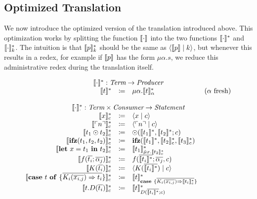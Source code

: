 \subsection{Optimized Translation}
\label{subsec:translation:optimized}
We now introduce the optimized version of the translation introduced above.
This optimization works by splitting the function $\llbracket \cdot \rrbracket$ into the two functions $\llbracket \cdot \rrbracket_{}^{\ast}$ and $\llbracket \cdot \rrbracket_{k}^{\ast}$.
The intuition is that $\llbracket p \rrbracket_{k}^{\ast}$ should be the same as $\langle \llbracket p \rrbracket \mid k \rangle$, but whenever this results in a redex, for example if $\llbracket p \rrbracket$ has the form $\mu \alpha.s$, we reduce this administrative redex during the translation itself.

\[
  \begin{array}{rcll}
    \multicolumn{4}{c}{\translatestar{\cdot}{} : \emph{Term} \rightarrow  \emph{Producer}}\\
    \translatestar{t}{} & \coloneqq & \mu\alpha.\translatestar{t}{\alpha} & \fresh{\alpha}\\
    \\
    \multicolumn{4}{c}{\translatestar{\cdot}{\cdot} : \emph{Term} \times \emph{Consumer} \rightarrow \emph{Statement}}\\
    \translatestar{x}{c} & \coloneq & \cut{x}{c} & \\
    \translatestar{\lit{n}}{c} & \coloneq & \cut{\lit{n}}{c} & \\
    \translatestar{t_1 \odot t_2}{c} & \coloneq & \odot(\translatestar{t_1}{}, \translatestar{t_2}{}; c) & \\
    \translatestar{\ifz{t_1}{t_2}{t_2}}{c} & \coloneq & \ifz{\translatestar{t_1}{}}{\translatestar{t_2}{c}}{\translatestar{t_3}{c}} & \\
    \translatestar{\letin{x}{t_1}{t_2}}{c} & \coloneq & \translatestar{t_1}{\tilde{\mu}x.\translatestar{t_2}{c}} & \\
    \translatestar{f(\overline{t_i}; \overline{\alpha_j})}{c} & \coloneq & f(\overline{\translatestar{t_i}{}}; \overline{\alpha_j}, c) & \\
    \translatestar{K(\overline{t_i})}{c} & \coloneq & \cut{K(\overline{\translatestar{t_i}{}})}{c} & \\
    \translatestar{\caseof{t}{\overline{K_i(\overline{x_{i,j}}) \Rightarrow t_i}}}{c} & \coloneq & \translatestar{t}{\case{\overline{K_i(\overline{x_{i,j}}) \Rightarrow \translatestar{t_i}{c}}}} & \\
    \translatestar{t.D(\overline{t_i})}{c} & \coloneq & \translatestar{t}{D(\overline{\translatestar{t_i}{}}; c)} & \\

\end{array}\]
